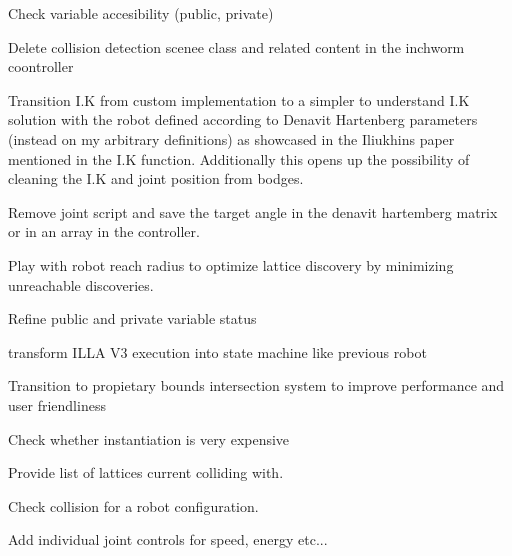 
\begin{DoxyRefList}
\item[Class \mbox{\hyperlink{class_illa_controller_v3}{Illa\+Controller\+V3}} ]\label{todo__todo000001}%
%
Check variable accesibility (public, private) 



Delete collision detection scenee class and related content in the inchworm coontroller 



Transition I.\+K from custom implementation to a simpler to understand I.\+K solution with the robot defined according to Denavit Hartenberg parameters (instead on my arbitrary definitions) as showcased in the Iliukhin\textquotesingle{}s paper mentioned in the I.\+K function. Additionally this opens up the possibility of cleaning the I.\+K and joint position from bodges. 



Remove joint script and save the target angle in the denavit hartemberg matrix or in an array in the controller. 



Play with robot reach radius to optimize lattice discovery by minimizing unreachable discoveries. 



Refine public and private variable status 



transform ILLA V3 execution into state machine like previous robot 
\item[Class \mbox{\hyperlink{class_illa_node_sensor_script}{Illa\+Node\+Sensor\+Script}} ]\label{todo__todo000003}%
%
Transition to propietary bounds intersection system to improve performance and user friendliness  
\item[Member \mbox{\hyperlink{class_inchworm_robot_controller_a434da4643498bd898d99a63678492ae4}{Inchworm\+Robot\+Controller.Is\+Pose\+Colliding}} (\mbox{\hyperlink{class_pos_j}{PosJ}} Pose\+To\+Check)]\label{todo__todo000004}%
%
Check whether instantiation is very expensive

\label{todo__todo000005}%
%
Provide list of lattices current colliding with.

\label{todo__todo000006}%
%
Check collision for a robot configuration.  
\item[Class \mbox{\hyperlink{class_joint_class}{Joint\+Class}} ]\label{todo__todo000007}%
%
Add individual joint controls for speed, energy etc... 




\end{DoxyRefList}
